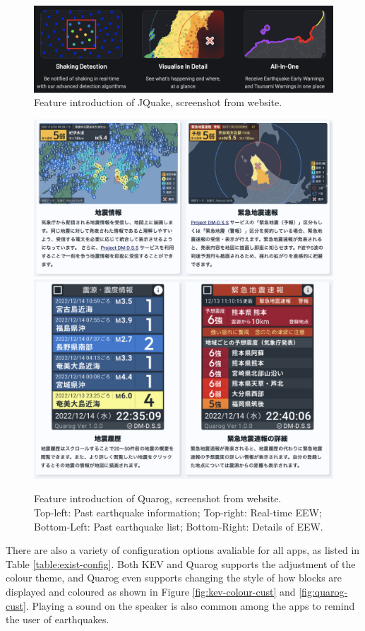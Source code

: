 \documentclass{article}
\begin{document}
\begin{figure}[!ht]
    \centering

    \includegraphics[width=0.6\linewidth]{jquake-features.png}
    \caption[Feature introduction of JQuake]{Feature introduction of JQuake, screenshot from website.}
    \label{fig:jquake-monitor-features}
\end{figure}

\begin{figure}[!ht]
    \centering

    \includegraphics[width=0.6\linewidth]{quarog-features-1.png}\\
    \includegraphics[width=0.6\linewidth]{quarog-features-2.png}
    \caption[Feature introduction of Quarog]{Feature introduction of Quarog, screenshot from website.\\Top-left: Past earthquake information; Top-right: Real-time EEW;\\Bottom-Left: Past earthquake list; Bottom-Right: Details of EEW.}
    \label{fig:quarog-monitor-features}
\end{figure}

There are also a variety of configuration options avaliable for all apps, as listed in Table \ref{table:exist-config}. Both KEV and Quarog supports the adjustment of the colour theme, and Quarog even supports changing the style of how blocks are displayed and coloured as shown in Figure \ref{fig:kev-colour-cust} and \ref{fig:quarog-cust}. Playing a sound on the speaker is also common among the apps to remind the user of earthquakes.
\end{document}
